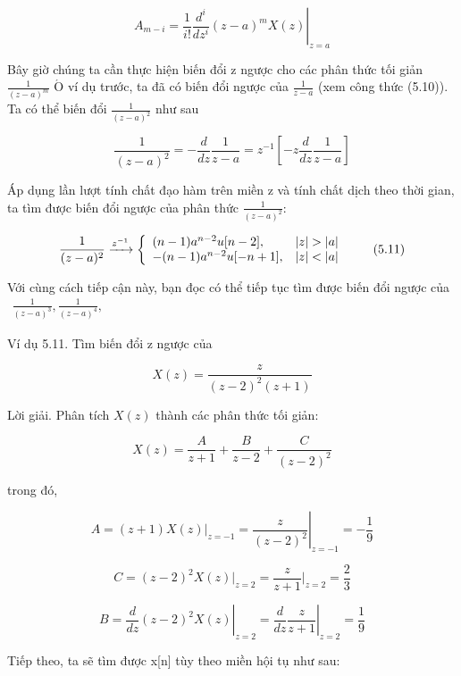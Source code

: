 \documentclass[
  10
]{article}
\begin{document}
\[
A _ {m - i} = \left. \frac {1}{i !} \frac {d ^ {i}}{d z ^ {i}} (z - a) ^ {m} X (z) \right| _ {z = a}
\]

Bây giờ chúng ta cần thực hiện biến đổi z ngược cho các phân thức tối
giản \(\frac { 1 } { ( z - a ) ^ { m } }\) \(\mathrm { \acute { O } }\)
ví dụ trước, ta đã có biến đổi ngược của
\(\scriptstyle { \frac { 1 } { z - a } }\) (xem công thức (5.10)). Ta có
thể biến đổi \(\frac { 1 } { ( z - a ) ^ { 2 } }\) như sau

\[
{\frac {1}{(z - a) ^ {2}}} = - {\frac {d}{d z}} {\frac {1}{z - a}} = z ^ {- 1} \left[ - z {\frac {d}{d z}} {\frac {1}{z - a}} \right]
\]

Áp dụng lần lượt tính chất đạo hàm trên miền z và tính chất dịch theo
thời gian, ta tìm được biến đổi ngược của phân thức
\(\scriptstyle { \frac { 1 } { ( z - a ) ^ { 2 } } } :\)

\[
\frac {1}{(z - a) ^ {2}} \xrightarrow {z ^ {- 1}} \left\{ \begin{array}{l l} (n - 1) a ^ {n - 2} u [ n - 2 ], & | z | > | a | \\ - (n - 1) a ^ {n - 2} u [ - n + 1 ], & | z | <   | a | \end{array} \right.\tag{5.11}
\]

Với cùng cách tiếp cận này, bạn đọc có thể tiếp tục tìm được biến đổi
ngược của
\(\begin{array} { r } { \frac { 1 } { ( z - a ) ^ { 3 } } , \frac { 1 } { ( z - a ) ^ { 4 } } , } \end{array}\)

Ví dụ 5.11. Tìm biến đổi z ngược của

\[
X (z) = \frac {z}{(z - 2) ^ {2} (z + 1)}
\]

Lời giải. Phân tích \(X ( z )\) thành các phân thức tối giản:

\[
X (z) = \frac {A}{z + 1} + \frac {B}{z - 2} + \frac {C}{(z - 2) ^ {2}}
\]

trong đó,

\[
A = (z + 1) X (z) | _ {z = - 1} = \left. \frac {z}{(z - 2) ^ {2}} \right| _ {z = - 1} = - \frac {1}{9}
\]

\[
C = (z - 2) ^ {2} X (z) \big | _ {z = 2} = \frac {z}{z + 1} \Big | _ {z = 2} = \frac {2}{3}
\]

\[
B = \left. \frac {d}{d z} (z - 2) ^ {2} X (z) \right| _ {z = 2} = \left. \frac {d}{d z} \frac {z}{z + 1} \right| _ {z = 2} = \frac {1}{9}
\]

Tiếp theo, ta sẽ tìm được x{[}n{]} tùy theo miền hội tụ như sau:
\end{document}
